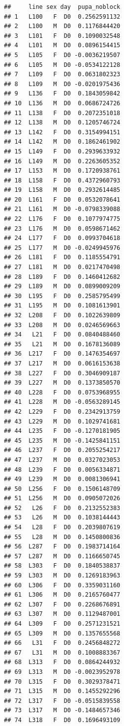 \documentclass[
]{article}
\begin{document}
\begin{verbatim}
##     line sex day  pupa_noblock
## 1   L100   F  D0  0.2562591132
## 2   L100   M  D0  0.1176844420
## 3   L101   F  D0  0.1090032548
## 4   L101   M  D0  0.0896154415
## 5   L105   F  D0 -0.0036219507
## 6   L105   M  D0 -0.0534122128
## 7   L109   F  D0  0.0631802323
## 8   L109   M  D0 -0.0201975436
## 9   L136   F  D0  0.1843059842
## 10  L136   M  D0  0.0686724726
## 11  L138   F  D0  0.2072351018
## 12  L138   M  D0  0.1205746724
## 13  L142   F  D0  0.3154994151
## 14  L142   M  D0  0.1862461902
## 15  L149   F  D0  0.2939633932
## 16  L149   M  D0  0.2263605352
## 17  L153   M  D0  0.1720938761
## 18  L158   F  D0  0.4372960793
## 19  L158   M  D0  0.2932614485
## 20  L161   F  D0  0.0532078641
## 21  L161   M  D0 -0.0798339088
## 22  L176   F  D0  0.1077974775
## 23  L176   M  D0  0.0598671462
## 24  L177   F  D0  0.0993704618
## 25  L177   M  D0 -0.0249945976
## 26  L181   F  D0  0.1185554791
## 27  L181   M  D0  0.0217470498
## 28  L189   F  D0  0.1460412682
## 29  L189   M  D0  0.0899009209
## 30  L195   F  D0  0.2585795499
## 31  L195   M  D0  0.1081613901
## 32  L208   F  D0  0.1022639809
## 33  L208   M  D0  0.0246569663
## 34   L21   F  D0  0.0840488460
## 35   L21   M  D0  0.1678136089
## 36  L217   F  D0  0.1476354697
## 37  L217   M  D0  0.0616153638
## 38  L227   F  D0  0.3046909187
## 39  L227   M  D0  0.1373850570
## 40  L228   F  D0  0.0753968955
## 41  L228   M  D0 -0.0563289145
## 42  L229   F  D0  0.2342913759
## 43  L229   M  D0  0.1029741681
## 44  L235   F  D0 -0.1270181905
## 45  L235   M  D0 -0.1425841151
## 46  L237   F  D0  0.2055254217
## 47  L237   M  D0  0.0327023053
## 48  L239   F  D0  0.0056334871
## 49  L239   M  D0  0.0081306941
## 50  L256   F  D0  0.1506148709
## 51  L256   M  D0  0.0905072026
## 52   L26   F  D0  0.2132552383
## 53   L26   M  D0  0.1038144443
## 54   L28   F  D0  0.2039807619
## 55   L28   M  D0  0.1450800836
## 56  L287   F  D0  0.1983714164
## 57  L287   M  D0  0.1166650745
## 58  L303   F  D0  0.1840538837
## 59  L303   M  D0  0.1269183963
## 60  L306   F  D0  0.3359031160
## 61  L306   M  D0  0.2165760477
## 62  L307   F  D0  0.2268676891
## 63  L307   M  D0  0.1129487001
## 64  L309   F  D0  0.2571231521
## 65  L309   M  D0  0.1357655568
## 66   L31   F  D0  0.2456848272
## 67   L31   M  D0  0.1008883367
## 68  L313   F  D0  0.0864244932
## 69  L313   M  D0 -0.0023952978
## 70  L315   F  D0  0.3029378471
## 71  L315   M  D0  0.1455292296
## 72  L317   F  D0 -0.0515839558
## 73  L317   M  D0 -0.1484657346
## 74  L318   F  D0  0.1696493109

\end{verbatim}
\end{document}
